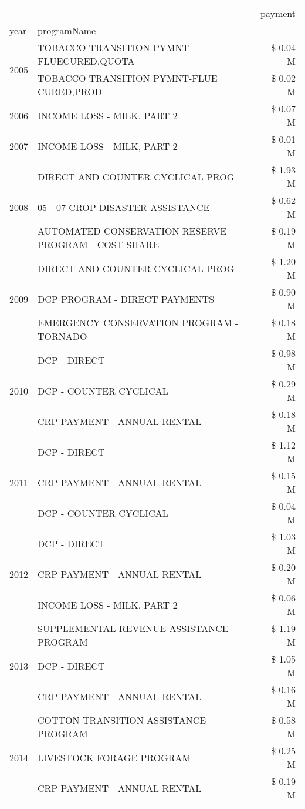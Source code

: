 \begin{tabular}{llr}
\toprule
 &  & payment \\
year & programName &  \\
\midrule
\multirow[t]{2}{*}{2005} & TOBACCO TRANSITION PYMNT-FLUECURED,QUOTA & \$ 0.04 M \\
 & TOBACCO TRANSITION PYMNT-FLUE CURED,PROD & \$ 0.02 M \\
\cline{1-3}
2006 & INCOME LOSS - MILK, PART 2 & \$ 0.07 M \\
\cline{1-3}
2007 & INCOME LOSS - MILK, PART 2 & \$ 0.01 M \\
\cline{1-3}
\multirow[t]{3}{*}{2008} & DIRECT AND COUNTER CYCLICAL PROG & \$ 1.93 M \\
 & 05 - 07 CROP DISASTER ASSISTANCE & \$ 0.62 M \\
 & AUTOMATED CONSERVATION RESERVE PROGRAM - COST SHARE & \$ 0.19 M \\
\cline{1-3}
\multirow[t]{3}{*}{2009} & DIRECT AND COUNTER CYCLICAL PROG & \$ 1.20 M \\
 & DCP PROGRAM - DIRECT PAYMENTS & \$ 0.90 M \\
 & EMERGENCY CONSERVATION PROGRAM - TORNADO & \$ 0.18 M \\
\cline{1-3}
\multirow[t]{3}{*}{2010} & DCP - DIRECT & \$ 0.98 M \\
 & DCP - COUNTER CYCLICAL & \$ 0.29 M \\
 & CRP PAYMENT - ANNUAL RENTAL & \$ 0.18 M \\
\cline{1-3}
\multirow[t]{3}{*}{2011} & DCP - DIRECT & \$ 1.12 M \\
 & CRP PAYMENT - ANNUAL RENTAL & \$ 0.15 M \\
 & DCP - COUNTER CYCLICAL & \$ 0.04 M \\
\cline{1-3}
\multirow[t]{3}{*}{2012} & DCP - DIRECT & \$ 1.03 M \\
 & CRP PAYMENT - ANNUAL RENTAL & \$ 0.20 M \\
 & INCOME LOSS - MILK, PART 2 & \$ 0.06 M \\
\cline{1-3}
\multirow[t]{3}{*}{2013} & SUPPLEMENTAL REVENUE ASSISTANCE PROGRAM & \$ 1.19 M \\
 & DCP - DIRECT & \$ 1.05 M \\
 & CRP PAYMENT - ANNUAL RENTAL & \$ 0.16 M \\
\cline{1-3}
\multirow[t]{3}{*}{2014} & COTTON TRANSITION ASSISTANCE PROGRAM & \$ 0.58 M \\
 & LIVESTOCK FORAGE PROGRAM & \$ 0.25 M \\
 & CRP PAYMENT - ANNUAL RENTAL & \$ 0.19 M \\

\end{tabular}
